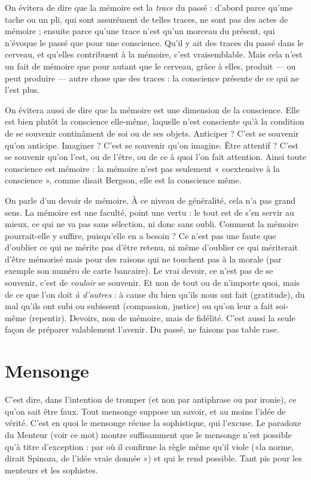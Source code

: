 On évitera de dire que la mémoire est la {\it trace} du passé : d’abord parce
qu’une tache ou un pli, qui sont assurément de telles traces, ne sont pas des
actes de mémoire ; ensuite parce qu’une trace n’est qu’un morceau du présent,
qui n’évoque le passé que pour une conscience. Qu'il y ait des traces du passé
dans le cerveau, et qu’elles contribuent à la mémoire, c’est vraisemblable. Mais
cela n’est un fait de mémoire que pour autant que le cerveau, grâce à elles, produit
 — ou peut produire — autre chose que des traces : la conscience présente de
ce qui ne l’est plus.

On évitera aussi de dire que la mémoire est une dimension de la conscience.
Elle est bien plutôt la conscience elle-même, laquelle n’est consciente
qu'à la condition de se souvenir continâment de soi ou de ses objets.
Anticiper ? C’est se souvenir qu’on anticipe. Imaginer ? C’est se souvenir qu’on
imagine. Être attentif ? C’est se souvenir qu’on l’est, ou de l'être, ou de ce à
quoi l’on fait attention. Ainsi toute conscience est mémoire : la mémoire n’est
pas seulement « coextensive à la conscience », comme disait Bergson, elle est la
conscience même.

On parle d’un devoir de mémoire. À ce niveau de généralité, cela n’a pas
grand sens. La mémoire est une faculté, point une vertu : le tout est de s’en
servir au mieux, ce qui ne va pas sans sélection, ni donc sans oubli. Comment
la mémoire pourrait-elle y suffire, puisqu’elle en a besoin ? Ce n’est pas une
faute que d’oublier ce qui ne mérite pas d’être retenu, ni même d’oublier ce qui
mériterait d’être mémorisé mais pour des raisons qui ne touchent pas à la
morale (par exemple son numéro de carte bancaire). Le vrai devoir, ce n’est pas
de se souvenir, c’est de {\it vouloir} se souvenir. Et non de tout ou de n’importe
quoi, mais de ce que l’on doit {\it à d'autres} : à cause du bien qu’ils nous ont fait
(gratitude), du mal qu’ils ont subi ou subissent (compassion, justice) ou qu’on
leur a fait soi-même (repentir). Devoirs, non de mémoire, mais de fidélité.
C’est aussi la seule façon de préparer valablement l’avenir. Du passé, ne faisons
pas table rase.

\section{Mensonge}
C'est dire, dans l'intention de tromper (et non par antiphrase
ou par ironie), ce qu’on sait être faux. Tout mensonge suppose
un savoir, et au moins l’idée de vérité. C’est en quoi le mensonge récuse
la sophistique, qui l’excuse. Le paradoxe du Menteur (voir ce mot) montre suffisamment
que le mensonge n’est possible qu’à titre d'exception : par où il confirme
la règle même qu’il viole («la norme, dirait Spinoza, de l’idée vraie
donnée ») et qui le rend possible. Tant pis pour les menteurs et les sophistes.

